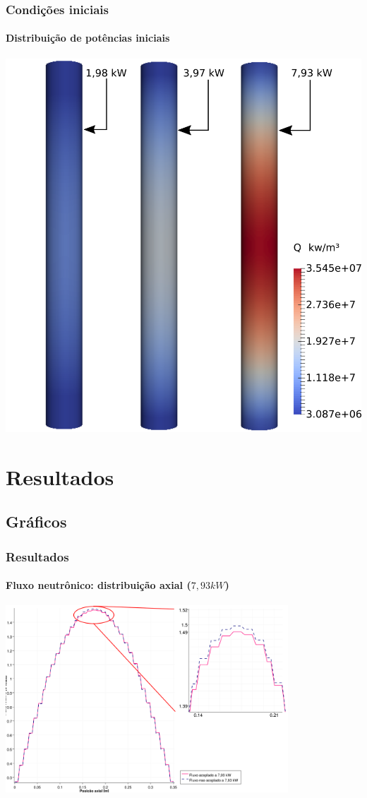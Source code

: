 \documentclass[svgnames,smaller,table]{beamer}
\begin{document}
\begin{frame}
  \frametitle{Condições iniciais}
  \framesubtitle{Distribuição de potências iniciais}
  \centering\includegraphics[scale=0.4]{../figuras/Q_fuel_all_NC.png}
\end{frame}

\section{Resultados}
\subsection{Gráficos}
\begin{frame}
  \frametitle{Resultados}
  \framesubtitle{Fluxo neutrônico: distribuição axial ($7,93 kW$)}
  \centering\includegraphics[width=\textwidth, height=7.0cm]{../figuras/Flux_rel_z_200_port_trabalhado.png}
  \label{fig:flux200z}
\end{frame}
\end{document}
